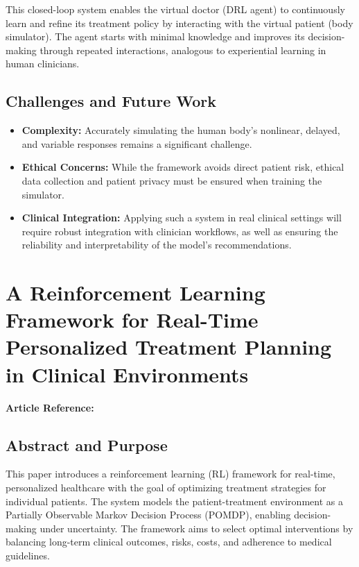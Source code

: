 This closed-loop system enables the virtual doctor (DRL agent) to continuously learn and refine its treatment policy by interacting with the virtual patient (body simulator). The agent starts with minimal knowledge and improves its decision-making through repeated interactions, analogous to experiential learning in human clinicians.

\subsection*{Challenges and Future Work}
\begin{itemize}
    \item \textbf{Complexity:} Accurately simulating the human body's nonlinear, delayed, and variable responses remains a significant challenge.
    \item \textbf{Ethical Concerns:} While the framework avoids direct patient risk, ethical data collection and patient privacy must be ensured when training the simulator.
    \item \textbf{Clinical Integration:} Applying such a system in real clinical settings will require robust integration with clinician workflows, as well as ensuring the reliability and interpretability of the model's recommendations.
\end{itemize}

\section{A Reinforcement Learning Framework for Real-Time Personalized Treatment Planning in Clinical Environments}
\textbf{Article Reference:} \cite{gorrepatiReinforcementLearningFramework2025}

\subsection*{Abstract and Purpose}
This paper introduces a reinforcement learning (RL) framework for real-time, personalized healthcare with the goal of optimizing treatment strategies for individual patients. The system models the patient-treatment environment as a Partially Observable Markov Decision Process (POMDP), enabling decision-making under uncertainty. The framework aims to select optimal interventions by balancing long-term clinical outcomes, risks, costs, and adherence to medical guidelines.

